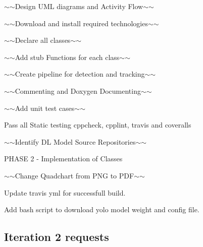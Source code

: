 \begin{DoxyItemize}
\item $\sim$$\sim$\+Design U\+ML diagrams and Activity Flow$\sim$$\sim$
\item $\sim$$\sim$\+Download and install required technologies$\sim$$\sim$
\item $\sim$$\sim$\+Declare all classes$\sim$$\sim$
\item $\sim$$\sim$\+Add stub Functions for each class$\sim$$\sim$
\item $\sim$$\sim$\+Create pipeline for detection and tracking$\sim$$\sim$
\item $\sim$$\sim$\+Commenting and Doxygen Documenting$\sim$$\sim$
\item $\sim$$\sim$\+Add unit test cases$\sim$$\sim$
\item Pass all Static testing cppcheck, cpplint, travis and coveralls
\item $\sim$$\sim$\+Identify DL Model Source Repositories$\sim$$\sim$
\item P\+H\+A\+SE 2 -\/ Implementation of Classes
\item $\sim$$\sim$\+Change Quadchart from P\+NG to P\+D\+F$\sim$$\sim$
\item Update travis yml for successfull build.
\item Add bash script to download yolo model weight and config file.
\end{DoxyItemize}

\subsection*{Iteration 2 requests}


